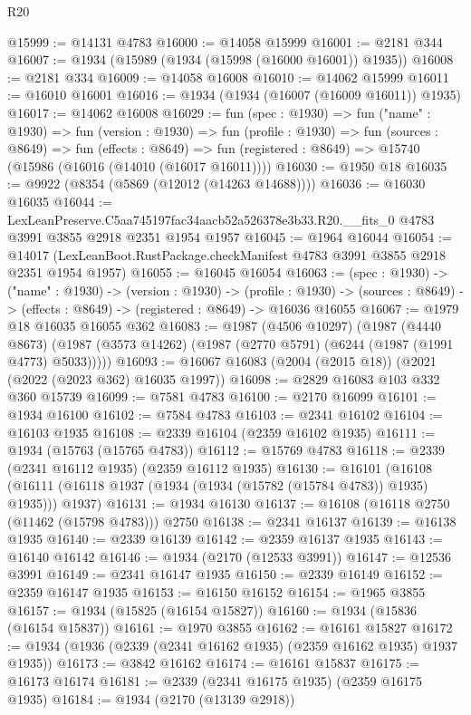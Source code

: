 \begin{lexlean}{R20}
\begin{coremodule}
@15999 := @14131 @4783
@16000 := @14058 @15999
@16001 := @2181 @344
@16007 := @1934 (@15989 (@1934 (@15998 (@16000 @16001)) @1935))
@16008 := @2181 @334
@16009 := @14058 @16008
@16010 := @14062 @15999
@16011 := @16010 @16001
@16016 := @1934 (@1934 (@16007 (@16009 @16011)) @1935)
@16017 := @14062 @16008
@16029 := fun (spec : @1930) =>
  fun ("name" : @1930) =>
  fun (version : @1930) =>
  fun (profile : @1930) =>
  fun (sources : @8649) =>
  fun (effects : @8649) =>
  fun (registered : @8649) => @15740 (@15986 (@16016 (@14010 (@16017 @16011))))
@16030 := @1950 @18
@16035 := @9922 (@8354 (@5869 (@12012 (@14263 @14688))))
@16036 := @16030 @16035
@16044 := LexLeanPreserve.C5aa745197fac34aacb52a526378e3b33.R20.__fits_0
    @4783
    @3991
    @3855
    @2918
    @2351
    @1954
    @1957
@16045 := @1964 @16044
@16054 := @14017 (LexLeanBoot.RustPackage.checkManifest @4783 @3991 @3855 @2918 @2351 @1954 @1957)
@16055 := @16045 @16054
@16063 := (spec : @1930) ->
  ("name" : @1930) ->
  (version : @1930) ->
  (profile : @1930) ->
  (sources : @8649) -> (effects : @8649) -> (registered : @8649) -> @16036 @16055
@16067 := @1979 @18 @16035 @16055 @362
@16083 := @1987
    (@4506 @10297)
    (@1987
      (@4440 @8673)
      (@1987 (@3573 @14262) (@1987 (@2770 @5791) (@6244 (@1987 (@1991 @4773) @5033)))))
@16093 := @16067 @16083 (@2004 (@2015 @18)) (@2021 (@2022 (@2023 @362) @16035 @1997))
@16098 := @2829 @16083 @103 @332 @360 @15739
@16099 := @7581 @4783
@16100 := @2170 @16099
@16101 := @1934 @16100
@16102 := @7584 @4783
@16103 := @2341 @16102
@16104 := @16103 @1935
@16108 := @2339 @16104 (@2359 @16102 @1935)
@16111 := @1934 (@15763 (@15765 @4783))
@16112 := @15769 @4783
@16118 := @2339 (@2341 @16112 @1935) (@2359 @16112 @1935)
@16130 := @16101
    (@16108 (@16111 (@16118 @1937 (@1934 (@1934 (@15782 (@15784 @4783)) @1935) @1935))) @1937)
@16131 := @1934 @16130
@16137 := @16108 (@16118 @2750 (@11462 (@15798 @4783))) @2750
@16138 := @2341 @16137
@16139 := @16138 @1935
@16140 := @2339 @16139
@16142 := @2359 @16137 @1935
@16143 := @16140 @16142
@16146 := @1934 (@2170 (@12533 @3991))
@16147 := @12536 @3991
@16149 := @2341 @16147 @1935
@16150 := @2339 @16149
@16152 := @2359 @16147 @1935
@16153 := @16150 @16152
@16154 := @1965 @3855
@16157 := @1934 (@15825 (@16154 @15827))
@16160 := @1934 (@15836 (@16154 @15837))
@16161 := @1970 @3855
@16162 := @16161 @15827
@16172 := @1934 (@1936 (@2339 (@2341 @16162 @1935) (@2359 @16162 @1935) @1937 @1935))
@16173 := @3842 @16162
@16174 := @16161 @15837
@16175 := @16173 @16174
@16181 := @2339 (@2341 @16175 @1935) (@2359 @16175 @1935)
@16184 := @1934 (@2170 (@13139 @2918))

\end{coremodule}
\end{lexlean}
